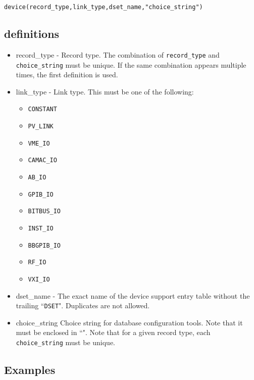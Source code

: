 \begin{verbatim}device(record_type,link_type,dset_name,"choice_string")
\end{verbatim}\subsection{definitions}

\begin{itemize}\item {}record\_type - Record type. The combination of \verb|record_type| and  \verb|choice_string| must be unique. If the 
same combination appears multiple times, the first definition is used. 

\item {}link\_type - Link type. This must be one of the following:

\begin{itemize}

\item \verb|CONSTANT|

\item \verb|PV_LINK|

\item \verb|VME_IO|

\item \verb|CAMAC_IO|

\item \verb|AB_IO|

\item \verb|GPIB_IO|

\item \verb|BITBUS_IO|

\item \verb|INST_IO|

\item \verb|BBGPIB_IO|

\item \verb|RF_IO|

\item \verb|VXI_IO|

\end{itemize}

\item {}dset\_name -  The exact name of the device support entry table without the trailing ``\verb|DSET|". Duplicates are not 
allowed.

\item {}choice\_string  Choice string for database configuration tools. Note that it must be enclosed in ``". Note that for a 
given record type, each \verb|choice_string| must be unique.

\end{itemize}\subsection{Examples}

